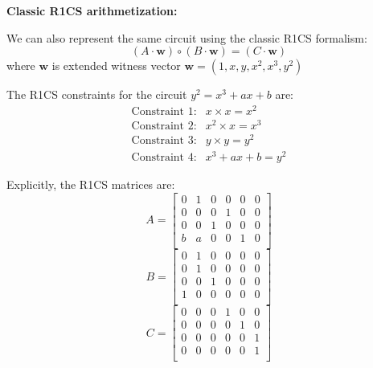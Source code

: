 \documentclass[../../book.tex]{subfiles}
\begin{document}
\begin{example}
\textbf{Classic R1CS arithmetization:}

We can also represent the same circuit using the classic R1CS formalism:
\[
(A \cdot \mathbf{w}) \circ (B \cdot \mathbf{w}) = (C \cdot \mathbf{w})
\]
where $\mathbf{w}$ is extended witness vector $\mathbf{w} = (1, x, y, x^2, x^3, y^2)$

The R1CS constraints for the circuit $y^2 = x^3 + a x + b$ are:
\[
\begin{array}{rl}
\text{Constraint 1:} & x \times x = x^2 \\
\text{Constraint 2:} & x^2 \times x = x^3 \\
\text{Constraint 3:} & y \times y = y^2 \\
\text{Constraint 4:} & x^3 + a x + b = y^2
\end{array}
\]

Explicitly, the R1CS matrices are:
\[
A = \begin{bmatrix}
0 & 1 & 0 & 0 & 0 & 0 \\
0 & 0 & 0 & 1 & 0 & 0 \\
0 & 0 & 1 & 0 & 0 & 0 \\
b & a & 0 & 0 & 1 & 0 \\
\end{bmatrix}
\]
\[
B = \begin{bmatrix}
0 & 1 & 0 & 0 & 0 & 0 \\
0 & 1 & 0 & 0 & 0 & 0 \\
0 & 0 & 1 & 0 & 0 & 0 \\
1 & 0 & 0 & 0 & 0 & 0 \\
\end{bmatrix}
\]
\[
C = \begin{bmatrix}
0 & 0 & 0 & 1 & 0 & 0 \\
0 & 0 & 0 & 0 & 1 & 0 \\
0 & 0 & 0 & 0 & 0 & 1 \\
0 & 0 & 0 & 0 & 0 & 1 \\
\end{bmatrix}
\]
\end{example}
\end{document}
